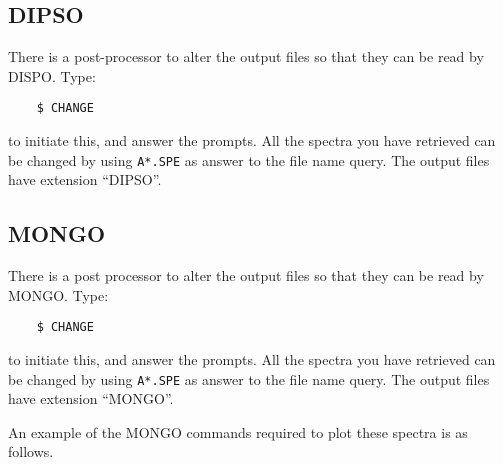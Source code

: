 \subsection{DIPSO}
There is a post-processor to alter the output files so that they can be
read by DISPO. Type:
\begin{verbatim}
    $ CHANGE
\end{verbatim}
to initiate this, and answer the prompts.
All the spectra you have retrieved can be changed by using {\tt A*.SPE} as
answer to the file name query.
The output files have extension ``DIPSO''.

\subsection{MONGO}
There is a post processor to alter the output files so that they can be
read by MONGO. Type:
\begin{verbatim}
    $ CHANGE
\end{verbatim}
to initiate this, and answer the prompts.
All the spectra you have retrieved can be changed by using {\tt A*.SPE} as
answer to the file name query.
The output files have extension ``MONGO''.

An example of the MONGO commands required to plot these spectra is as follows.

